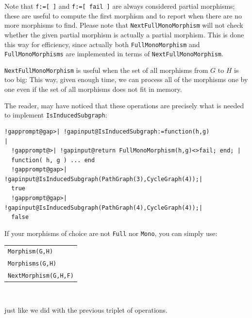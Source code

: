 \documentclass[a4paper,11pt]{report}
\begin{document}
{{Note that \texttt{f:=[ ]} and \texttt{f:=[ fail ]} are always considered partial morphisms; these are useful to compute the first
morphism and to report when there are no more morphisms to find. Please note
that \texttt{NextFullMonoMorphism} will not check whether the given partial morphism is actually a partial
morphism. This is done this way for efficiency, since actually both \texttt{FullMonoMorphism} and \texttt{FullMonoMorphisms} are implemented in terms of \texttt{NextFullMonoMorphism}. 

\texttt{NextFullMonoMorphism} is useful when the set of all morphisms from $G$ to $H$ is too big: This way, given enough time, we can process all of the morphisms
one by one even if the set of all morphisms does not fit in memory. 

The reader, may have noticed that these operations are precisely what is
needed to implement \texttt{IsInducedSubgraph}: 

 
\begin{Verbatim}[commandchars=!@|,fontsize=\small,frame=single,label=Example]
  !gapprompt@gap>| !gapinput@IsInducedSubgraph:=function(h,g)                                        |
  !gapprompt@>| !gapinput@return FullMonoMorphism(h,g)<>fail; end; |
  function( h, g ) ... end
  !gapprompt@gap>| !gapinput@IsInducedSubgraph(PathGraph(3),CycleGraph(4));|
  true
  !gapprompt@gap>| !gapinput@IsInducedSubgraph(PathGraph(4),CycleGraph(4));|
  false
\end{Verbatim}
 

If your morphisms of choice are not \texttt{Full} nor \texttt{Mono}, you can simply use: \begin{center}
\begin{tabular}{l}\texttt{Morphism(G,H)} \index{Morphism@\texttt{Morphism}}\\
\texttt{Morphisms(G,H)} \index{Morphisms@\texttt{Morphisms}}\\
\texttt{NextMorphism(G,H,F)} \index{NextMorphism@\texttt{NextMorphism}}\\
\end{tabular}\\[2mm]
\end{center}

 just like we did with the previous triplet of operations. 

}}
\end{document}
